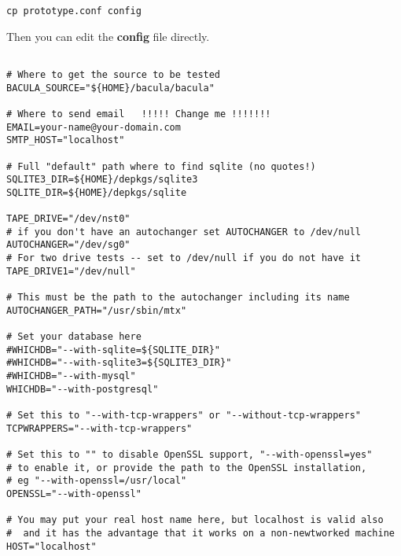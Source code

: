 \footnotesize
\begin{verbatim}
cp prototype.conf config
\end{verbatim}
\normalsize

Then you can edit the {\bf config} file directly.

\footnotesize
\begin{verbatim}
                                                                                        
# Where to get the source to be tested
BACULA_SOURCE="${HOME}/bacula/bacula"

# Where to send email   !!!!! Change me !!!!!!!
EMAIL=your-name@your-domain.com
SMTP_HOST="localhost"

# Full "default" path where to find sqlite (no quotes!)
SQLITE3_DIR=${HOME}/depkgs/sqlite3
SQLITE_DIR=${HOME}/depkgs/sqlite

TAPE_DRIVE="/dev/nst0"
# if you don't have an autochanger set AUTOCHANGER to /dev/null
AUTOCHANGER="/dev/sg0"
# For two drive tests -- set to /dev/null if you do not have it 
TAPE_DRIVE1="/dev/null"

# This must be the path to the autochanger including its name
AUTOCHANGER_PATH="/usr/sbin/mtx"

# Set your database here
#WHICHDB="--with-sqlite=${SQLITE_DIR}"
#WHICHDB="--with-sqlite3=${SQLITE3_DIR}"
#WHICHDB="--with-mysql"
WHICHDB="--with-postgresql"

# Set this to "--with-tcp-wrappers" or "--without-tcp-wrappers"
TCPWRAPPERS="--with-tcp-wrappers"

# Set this to "" to disable OpenSSL support, "--with-openssl=yes"
# to enable it, or provide the path to the OpenSSL installation,
# eg "--with-openssl=/usr/local"
OPENSSL="--with-openssl"

# You may put your real host name here, but localhost is valid also
#  and it has the advantage that it works on a non-newtworked machine
HOST="localhost"
                                                                                        
\end{verbatim}
\normalsize

